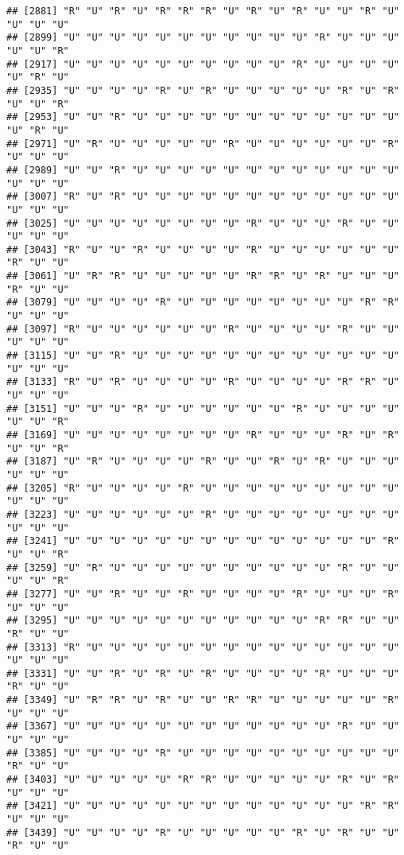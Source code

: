 \documentclass[
]{article}
\begin{document}
\begin{verbatim}
## [2881] "R" "U" "R" "U" "R" "R" "R" "U" "R" "U" "R" "U" "U" "R" "U" "U" "U" "U"
## [2899] "U" "U" "U" "U" "U" "U" "U" "U" "U" "U" "U" "R" "U" "U" "U" "U" "U" "R"
## [2917] "U" "U" "U" "U" "U" "U" "U" "U" "U" "U" "R" "U" "U" "U" "U" "U" "R" "U"
## [2935] "U" "U" "U" "U" "R" "U" "R" "U" "U" "U" "U" "U" "R" "U" "R" "U" "U" "R"
## [2953] "U" "U" "R" "U" "U" "U" "U" "U" "U" "U" "U" "U" "U" "U" "U" "U" "R" "U"
## [2971] "U" "R" "U" "U" "U" "U" "U" "R" "U" "U" "U" "U" "U" "U" "R" "U" "U" "U"
## [2989] "U" "U" "R" "U" "U" "U" "U" "U" "U" "U" "U" "U" "U" "U" "U" "U" "U" "U"
## [3007] "R" "U" "R" "U" "U" "U" "U" "U" "U" "U" "U" "U" "U" "U" "U" "U" "U" "U"
## [3025] "U" "U" "U" "U" "U" "U" "U" "U" "R" "U" "U" "U" "R" "U" "U" "U" "U" "U"
## [3043] "R" "U" "U" "R" "U" "U" "U" "U" "R" "U" "U" "U" "U" "U" "U" "R" "U" "U"
## [3061] "U" "R" "R" "U" "U" "U" "U" "U" "R" "R" "U" "R" "U" "U" "U" "R" "U" "U"
## [3079] "U" "U" "U" "U" "R" "U" "U" "U" "U" "U" "U" "U" "U" "R" "R" "U" "U" "U"
## [3097] "R" "U" "U" "U" "U" "U" "U" "R" "U" "U" "U" "U" "R" "U" "U" "U" "U" "U"
## [3115] "U" "U" "R" "U" "U" "U" "U" "U" "U" "U" "U" "U" "U" "U" "U" "U" "U" "U"
## [3133] "R" "U" "R" "U" "U" "U" "U" "R" "U" "U" "U" "U" "R" "R" "U" "U" "U" "U"
## [3151] "U" "U" "U" "R" "U" "U" "U" "U" "U" "U" "R" "U" "U" "U" "U" "U" "U" "R"
## [3169] "U" "U" "U" "U" "U" "U" "U" "U" "R" "U" "U" "U" "R" "U" "R" "U" "U" "R"
## [3187] "U" "R" "U" "U" "U" "U" "R" "U" "U" "R" "U" "R" "U" "U" "U" "U" "U" "U"
## [3205] "R" "U" "U" "U" "U" "R" "U" "U" "U" "U" "U" "U" "U" "U" "U" "U" "U" "U"
## [3223] "U" "U" "U" "U" "U" "U" "R" "U" "U" "U" "U" "U" "U" "U" "U" "U" "U" "U"
## [3241] "U" "U" "U" "U" "U" "U" "U" "U" "U" "U" "U" "U" "U" "U" "R" "U" "U" "R"
## [3259] "U" "R" "U" "U" "U" "U" "U" "U" "U" "U" "U" "U" "R" "U" "U" "U" "U" "R"
## [3277] "U" "U" "R" "U" "U" "R" "U" "U" "U" "U" "R" "U" "U" "U" "R" "U" "U" "U"
## [3295] "U" "U" "U" "U" "U" "U" "U" "U" "U" "U" "U" "R" "R" "U" "U" "R" "U" "U"
## [3313] "R" "U" "U" "U" "U" "U" "U" "U" "U" "U" "U" "U" "U" "U" "U" "U" "U" "U"
## [3331] "U" "U" "R" "U" "R" "U" "R" "U" "U" "U" "U" "R" "U" "U" "U" "R" "U" "U"
## [3349] "U" "R" "R" "U" "R" "U" "U" "R" "R" "U" "U" "U" "U" "U" "R" "U" "U" "U"
## [3367] "U" "U" "U" "U" "U" "U" "U" "U" "U" "U" "U" "U" "R" "U" "U" "U" "U" "U"
## [3385] "U" "U" "U" "U" "R" "U" "U" "U" "U" "U" "U" "U" "U" "U" "U" "R" "U" "U"
## [3403] "U" "U" "U" "U" "U" "R" "R" "U" "U" "U" "U" "U" "R" "U" "R" "U" "U" "U"
## [3421] "U" "U" "U" "U" "U" "U" "U" "U" "U" "U" "U" "U" "U" "R" "R" "U" "U" "U"
## [3439] "U" "U" "U" "U" "R" "U" "U" "U" "U" "U" "R" "U" "R" "U" "U" "R" "U" "U"

\end{verbatim}
\end{document}
